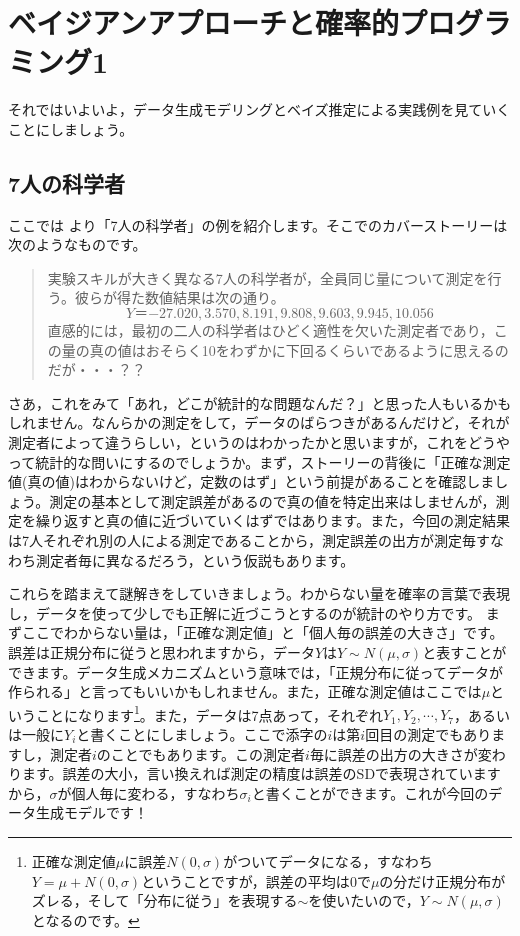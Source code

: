 \documentclass{ltjsbook}
\begin{document}
 
\chapter{ベイジアンアプローチと確率的プログラミング1}
それではいよいよ，データ生成モデリングとベイズ推定による実践例を見ていくことにしましょう。
\label{chapter18} 
\section{7人の科学者}
ここでは \citet{Lee201709}より「7人の科学者」の例を紹介します。そこでのカバーストーリーは次のようなものです。

\begin{quote}
    実験スキルが大きく異なる7人の科学者が，全員同じ量について測定を行う。彼らが得た数値結果は次の通り。
    $$Y＝{-27.020,3.570,8.191,9.808,9.603,9.945,10.056}$$
    直感的には，最初の二人の科学者はひどく適性を欠いた測定者であり，この量の真の値はおそらく10をわずかに下回るくらいであるように思えるのだが・・・？？
\end{quote}

さあ，これをみて「あれ，どこが統計的な問題なんだ？」と思った人もいるかもしれません。なんらかの測定をして，データのばらつきがあるんだけど，それが測定者によって違うらしい，というのはわかったかと思いますが，これをどうやって統計的な問いにするのでしょうか。まず，ストーリーの背後に「正確な測定値(真の値)はわからないけど，定数のはず」という前提があることを確認しましょう。測定の基本として測定誤差があるので真の値を特定出来はしませんが，測定を繰り返すと真の値に近づいていくはずではあります。また，今回の測定結果は7人それぞれ別の人による測定であることから，測定誤差の出方が測定毎すなわち測定者毎に異なるだろう，という仮説もあります。

これらを踏まえて謎解きをしていきましょう。わからない量を確率の言葉で表現し，データを使って少しでも正解に近づこうとするのが統計のやり方です。
まずここでわからない量は，「正確な測定値」と「個人毎の誤差の大きさ」です。誤差は正規分布に従うと思われますから，データ$Y$は$Y\sim N(\mu, \sigma)$と表すことができます。データ生成メカニズムという意味では，「正規分布に従ってデータが作られる」と言ってもいいかもしれません。また，正確な測定値はここでは$\mu$ということになります\footnote{正確な測定値$\mu$に誤差$N(0,\sigma)$がついてデータになる，すなわち$Y=\mu+N(0,\sigma)$ということですが，誤差の平均は$0$で$\mu$の分だけ正規分布がズレる，そして「分布に従う」を表現する$\sim$を使いたいので，$Y\sim N(\mu,\sigma)$となるのです。}。また，データは7点あって，それぞれ$Y_1,Y_2,\cdots,Y_7$，あるいは一般に$Y_i$と書くことにしましょう。ここで添字の$i$は第$i$回目の測定でもありますし，測定者$i$のことでもあります。この測定者$i$毎に誤差の出方の大きさが変わります。誤差の大小，言い換えれば測定の精度は誤差のSDで表現されていますから，$\sigma$が個人毎に変わる，すなわち$\sigma_i$と書くことができます。これが今回のデータ生成モデルです！
\end{document}
